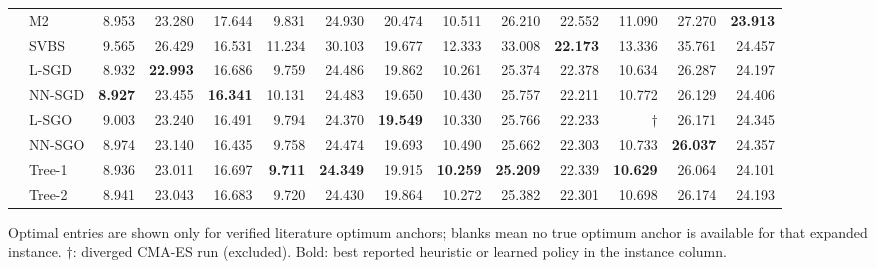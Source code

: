 \begin{table}[!htbp]
{\begin{tabular}{llrrrrrrrrrrrr}
 & M2 & 8.953 & 23.280 & 17.644 & 9.831 & 24.930 & 20.474 & 10.511 & 26.210 & 22.552 & 11.090 & 27.270 & \textbf{23.913} \\
 & SVBS & 9.565 & 26.429 & 16.531 & 11.234 & 30.103 & 19.677 & 12.333 & 33.008 & \textbf{22.173} & 13.336 & 35.761 & 24.457 \\
 & L-SGD & 8.932 & \textbf{22.993} & 16.686 & 9.759 & 24.486 & 19.862 & 10.261 & 25.374 & 22.378 & 10.634 & 26.287 & 24.197 \\
 & NN-SGD & \textbf{8.927} & 23.455 & \textbf{16.341} & 10.131 & 24.483 & 19.650 & 10.430 & 25.757 & 22.211 & 10.772 & 26.129 & 24.406 \\
 & L-SGO & 9.003 & 23.240 & 16.491 & 9.794 & 24.370 & \textbf{19.549} & 10.330 & 25.766 & 22.233 & $\dagger$ & 26.171 & 24.345 \\
 & NN-SGO & 8.974 & 23.140 & 16.435 & 9.758 & 24.474 & 19.693 & 10.490 & 25.662 & 22.303 & 10.733 & \textbf{26.037} & 24.357 \\
 & Tree-1 & 8.936 & 23.011 & 16.697 & \textbf{9.711} & \textbf{24.349} & 19.915 & \textbf{10.259} & \textbf{25.209} & 22.339 & \textbf{10.629} & 26.064 & 24.101 \\
 & Tree-2 & 8.941 & 23.043 & 16.683 & 9.720 & 24.430 & 19.864 & 10.272 & 25.382 & 22.301 & 10.698 & 26.174 & 24.193 \\
\bottomrule
\end{tabular}}
\par\medskip\footnotesize Optimal entries are shown only for verified literature optimum anchors; blanks mean no true optimum anchor is available for that expanded instance. $\dagger$: diverged CMA-ES run (excluded). Bold: best reported heuristic or learned policy in the instance column.
\end{table}
\FloatBarrier

